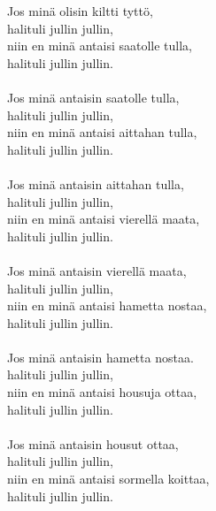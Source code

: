
            Jos minä olisin kiltti tyttö,  \\
            halituli jullin jullin, \\
            niin en minä antaisi saatolle tulla, \\
            halituli jullin jullin.  \\
\hspace{10mm} \\
            Jos minä antaisin saatolle tulla, \\
            halituli jullin jullin,  \\
            niin en minä antaisi aittahan tulla,  \\
            halituli jullin jullin. \\
\hspace{10mm} \\
            Jos minä antaisin aittahan tulla, \\
            halituli jullin jullin,  \\
            niin en minä antaisi vierellä maata,  \\
            halituli jullin jullin. \\
\hspace{10mm} \\
            Jos minä antaisin vierellä maata, \\
            halituli jullin jullin,  \\
            niin en minä antaisi hametta nostaa,  \\
            halituli jullin jullin. \\
\hspace{10mm} \\
            Jos minä antaisin hametta nostaa. \\
            halituli jullin jullin, \\
            niin en minä antaisi housuja ottaa, \\
            halituli jullin jullin. \\
\hspace{10mm} \\
            Jos minä antaisin housut ottaa,  \\
            halituli jullin jullin, \\
            niin en minä antaisi sormella koittaa, \\
            halituli jullin jullin. \\
